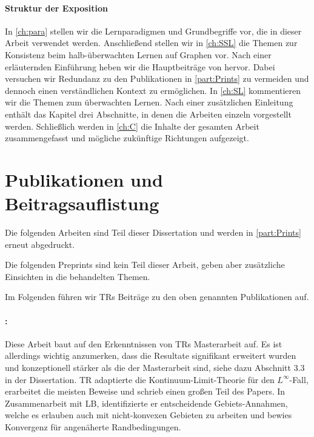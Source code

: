 \paragraph{Struktur der Exposition} In \cref{ch:para} stellen wir die Lernparadigmen und Grundbegriffe vor, die in dieser Arbeit verwendet werden. Anschließend stellen wir in \cref{ch:SSL} die Themen zur Konsistenz beim halb-überwachten Lernen auf Graphen vor. Nach einer erläuternden Einführung heben wir die Hauptbeiträge von \cite{roith2022continuum,bungert2021uniform} hervor. Dabei versuchen wir Redundanz zu den Publikationen in \cref{part:Prints} zu vermeiden und dennoch einen verständlichen Kontext zu ermöglichen. In \cref{ch:SL} kommentieren wir die Themen zum überwachten Lernen. Nach einer zusätzlichen Einleitung enthält das Kapitel drei Abschnitte, in denen die Arbeiten \cite{kabri2023resolution,bungert2021clip,bungert2022bregman} einzeln vorgestellt werden. Schließlich werden in \cref{ch:C} die Inhalte der gesamten Arbeit zusammengefasst und mögliche zukünftige Richtungen aufgezeigt.
%
%
%
%
%
\section*{Publikationen und Beitragsauflistung}
Die folgenden Arbeiten sind Teil dieser Dissertation und werden in \cref{part:Prints} erneut abgedruckt.

\printbibliography[keyword={papersA}, resetnumbers=true, heading=none]
\printbibliography[keyword={papersB}, resetnumbers=true, heading=none]

\noindent%
Die folgenden Preprints sind kein Teil dieser Arbeit, geben aber zusätzliche Einsichten in die behandelten Themen.

\printbibliography[keyword={papersC}, resetnumbers=true, heading=none]

Im Folgenden führen wir TRs Beiträge zu den oben genannten Publikationen auf. 

\paragraph{\cite{roith2022continuum}:} Diese Arbeit baut auf den Erkenntnissen von TRs Masterarbeit auf. Es ist allerdings wichtig anzumerken, dass die Resultate signifikant erweitert wurden und konzeptionell stärker als die der Masterarbeit sind, siehe dazu Abschnitt 3.3 in der Dissertation. TR adaptierte die Kontinuum-Limit-Theorie für den $L^\infty$-Fall, erarbeitet die meisten Beweise und schrieb einen großen Teil des Papers. In Zusammenarbeit mit LB, identifizierte er entscheidende Gebiets-Annahmen, welche es erlauben auch mit nicht-konvexen Gebieten zu arbeiten und bewies Konvergenz für angenäherte Randbedingungen.

